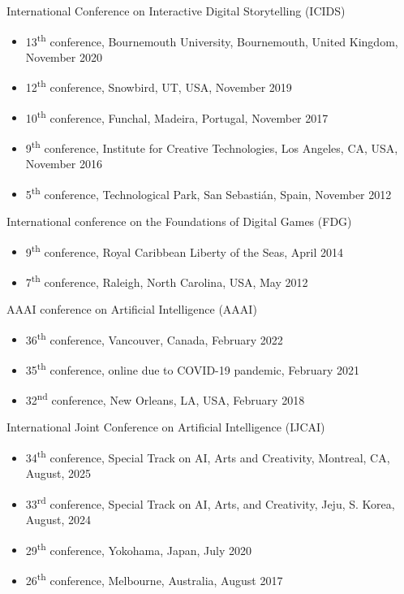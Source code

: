\documentclass{cv}
\begin{document}
\noindent International Conference on Interactive Digital Storytelling (ICIDS)
\begin{itemize}
	\item 13\textsuperscript{th} conference, Bournemouth University, Bournemouth, United Kingdom, November 2020
	\item 12\textsuperscript{th} conference, Snowbird, UT, USA, November 2019
	\item 10\textsuperscript{th} conference, Funchal, Madeira, Portugal, November 2017
	\item 9\textsuperscript{th} conference, Institute for Creative Technologies, Los Angeles, CA, USA, November 2016
	\item 5\textsuperscript{th} conference, Technological Park, San Sebastián, Spain, November 2012
\end{itemize}

\noindent International conference on the Foundations of Digital Games (FDG)
\begin{itemize}
	\item 9\textsuperscript{th} conference, Royal Caribbean Liberty of the Seas, April 2014
	\item 7\textsuperscript{th} conference, Raleigh, North Carolina, USA, May 2012
\end{itemize}

\noindent AAAI conference on Artificial Intelligence (AAAI)
\begin{itemize}
	\item 36\textsuperscript{th} conference, Vancouver, Canada, February 2022
	\item 35\textsuperscript{th} conference, online due to COVID-19 pandemic, February 2021
	\item 32\textsuperscript{nd} conference, New Orleans, LA, USA, February 2018
\end{itemize}

\noindent International Joint Conference on Artificial Intelligence (IJCAI)
\begin{itemize}
	\item 34\textsuperscript{th} conference, Special Track on AI, Arts and Creativity, Montreal, CA, August, 2025
	\item 33\textsuperscript{rd} conference, Special Track on AI, Arts, and Creativity, Jeju, S. Korea, August, 2024
	\item 29\textsuperscript{th} conference, Yokohama, Japan, July 2020
	\item 26\textsuperscript{th} conference, Melbourne, Australia, August 2017
\end{itemize}
\end{document}
